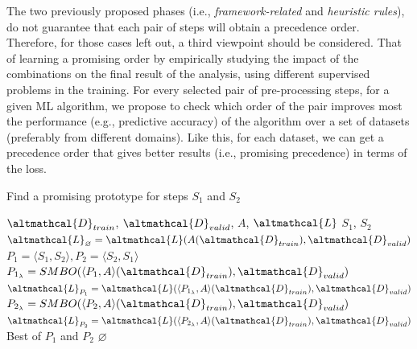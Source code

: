 The two previously proposed phases (i.e., \textit{framework-related} and \textit{heuristic rules}), do not guarantee that each pair of steps will obtain a precedence order.
Therefore, for those cases left out, a third viewpoint should be considered.
That of learning a promising order by empirically studying the impact of the combinations on the final result of the analysis, using different supervised problems in the training.
For every selected pair of pre-processing steps, for a given ML algorithm, we propose to check which order of the pair improves most the performance (e.g., predictive accuracy) of the algorithm over a set of datasets (preferably from different domains).
Like this, for each dataset, we can get a precedence order that gives better results (i.e., promising precedence) in terms of the loss.


\begin{algorithm*}[!h]
	\caption{Find a promising prototype for steps $S_1$ and $S_2$}
	\label{alg:learned-rules}
	\begin{algorithmic}[1]
		\Require $\altmathcal{D}_{train}$, $\altmathcal{D}_{valid}$, $A$, $\altmathcal{L}$ $S_1$, $S_2$ 
		\State $\altmathcal{L}_{\varnothing} = \altmathcal{L}(A(\altmathcal{D}_{train}), \altmathcal{D}_{valid})$ 
		\State $P_1 = \langle S_1, S_2 \rangle, P_2 = \langle S_2, S_1 \rangle$ 
		\State $P_{1_{\lambda}} = SMBO(\langle P_1, A \rangle(\altmathcal{D}_{train}), \altmathcal{D}_{valid})$ 
		\State $\altmathcal{L}_{P_1} = \altmathcal{L}(\langle P_{1_{\lambda}}, A \rangle(\altmathcal{D}_{train}), \altmathcal{D}_{valid})$ 
		\State $P_{2_{\lambda}} = SMBO(\langle P_2, A \rangle(\altmathcal{D}_{train}), \altmathcal{D}_{valid})$
		\State $\altmathcal{L}_{P_2} = \altmathcal{L}(\langle P_{2_{\lambda}}, A \rangle(\altmathcal{D}_{train}), \altmathcal{D}_{valid})$ 
        \State \Return Best of $P_1$ and $P_2$
		\Else
		\State \Return $\varnothing$
		\EndIf
	\end{algorithmic}
\end{algorithm*}

